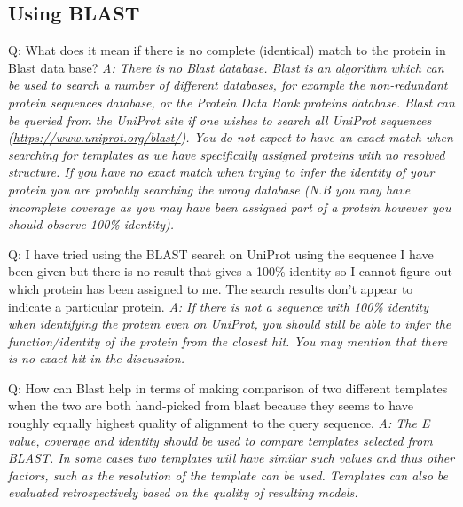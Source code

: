 \documentclass[10pt,a4paper]{article}
\begin{document}
\subsection{Using BLAST}
Q: What does it mean if there is no complete (identical) match to the protein in Blast data base? \newline
\textit{A: There is no Blast database. Blast is an algorithm which can be used to search a number of different databases, for example the non-redundant protein sequences database, or the Protein Data Bank proteins database. Blast can be queried from the UniProt site if one wishes to search all UniProt sequences (\url{https://www.uniprot.org/blast/}). You do not expect to have an exact match when searching for templates as we have specifically assigned proteins with no resolved structure. If you have no exact match when trying to infer the identity of your protein you are probably searching the wrong database (N.B you may have incomplete coverage as you may have been assigned part of a protein however you should observe 100\% identity).} \newline

Q: I have tried using the BLAST search on UniProt using the sequence I have been given but there is no result that gives a 100\% identity so I cannot figure out which protein has been assigned to me. The search results don't appear to indicate a particular protein. \newline
\textit{A: If there is not a sequence with 100\% identity when identifying the protein even on UniProt, you should still be able to infer the function/identity of the protein from the closest hit. You may mention that there is no exact hit in the discussion.} \newline

Q: How can Blast help in terms of making comparison of two different templates when the two are both hand-picked from blast because they seems to have roughly equally highest quality of alignment to the query sequence. \newline
\textit{A: The E value, coverage and identity should be used to compare templates selected from BLAST. In some cases two templates will have similar such values and thus other factors, such as the resolution of the template can be used. Templates can also be evaluated retrospectively based on the quality of resulting models.} \newline
\end{document}
